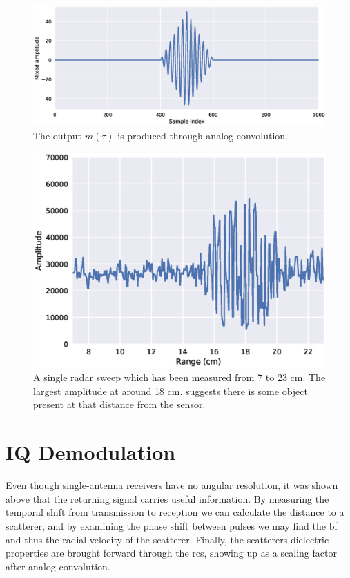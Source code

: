 \begin{figure}[t]
	\centering
	\includegraphics[scale=0.5]{figs_temp/mixing2}
	\caption{The output $m(\tau)$ is produced through analog convolution.}
	\label{fig:mix2}
\end{figure}

\begin{figure}[t]
	\centering
	\includegraphics[scale=0.7]{figs_temp/single_sweep_raw}
	\caption{A single radar sweep which has been measured from 7 to 23 cm. The largest amplitude at around 18 cm. suggests there is some object present at that distance from the sensor.}
	\label{fig:single_sweep_raw}
\end{figure}

\section{IQ Demodulation}
\label{sec:iq}

Even though single-antenna receivers have no angular resolution, it was shown above that the returning signal carries useful information. By measuring the temporal shift from transmission to reception we can calculate the distance to a scatterer, and by examining the phase shift between pulses we may find the \gls{bf} and thus the radial velocity of the scatterer. Finally, the scatterers dielectric properties are brought forward through the \gls{rcs}, showing up as a scaling factor after analog convolution. 

